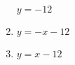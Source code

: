 \documentclass{article}%
\begin{document}
\begin{multicols}{2}
\begin{enumerate}[label=\arabic*),start=1]
$y=-12$

%
\newline%
\newline%
%
\vspace{2.5cm}%
\item%


$y=-x-12$

%
\newline%
\newline%
%
\vspace{2.5cm}%
\item%


$y=x-12$

%
\newline%
\newline%
%
\vspace{2.5cm}%
\end{enumerate}

%
\end{multicols}%
\end{document}
